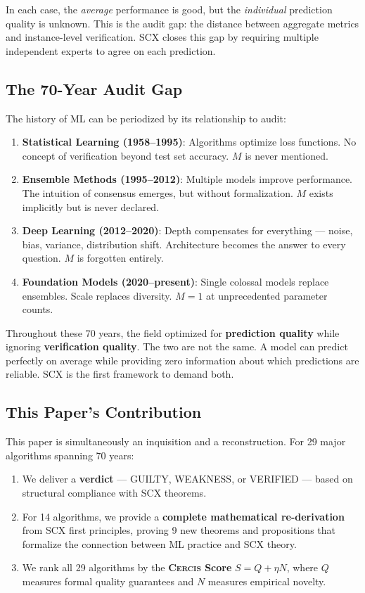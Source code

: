 \documentclass[12pt,a4paper]{article}
\theoremstyle{definition}
\newcommand{\Cercis}{\textsc{Cercis}}
\newcommand{\SCX}{\textsc{SCX}}
\begin{document}
In each case, the \textit{average} performance is good, but the \textit{individual} prediction quality is unknown. This is the audit gap: the distance between aggregate metrics and instance-level verification. \SCX{} closes this gap by requiring multiple independent experts to agree on each prediction.

\subsection{The 70-Year Audit Gap }

The history of ML can be periodized by its relationship to audit:

\begin{enumerate}[label=\textbf{Era \arabic*:}, nosep]
    \item \textbf{Statistical Learning (1958--1995)}: Algorithms optimize loss functions. No concept of verification beyond test set accuracy. $M$ is never mentioned.
    \item \textbf{Ensemble Methods (1995--2012)}: Multiple models improve performance. The intuition of consensus emerges, but without formalization. $M$ exists implicitly but is never declared.
    \item \textbf{Deep Learning (2012--2020)}: Depth compensates for everything — noise, bias, variance, distribution shift. Architecture becomes the answer to every question. $M$ is forgotten entirely.
    \item \textbf{Foundation Models (2020--present)}: Single colossal models replace ensembles. Scale replaces diversity. $M=1$ at unprecedented parameter counts.
\end{enumerate}

Throughout these 70 years, the field optimized for \textbf{prediction quality} while ignoring \textbf{verification quality}. The two are not the same. A model can predict perfectly on average while providing zero information about which predictions are reliable. \SCX{} is the first framework to demand both.

\subsection{This Paper's Contribution }

This paper is simultaneously an inquisition and a reconstruction. For 29 major algorithms spanning 70 years:

\begin{enumerate}[label=(\roman*)]
    \item We deliver a \textbf{verdict} — GUILTY, WEAKNESS, or VERIFIED — based on structural compliance with \SCX{} theorems.
    \item For 14 algorithms, we provide a \textbf{complete mathematical re-derivation} from \SCX{} first principles, proving 9 new theorems and propositions that formalize the connection between ML practice and \SCX{} theory.
    \item We rank all 29 algorithms by the \textbf{\Cercis{} Score} $S = Q + \eta N$, where $Q$ measures formal quality guarantees and $N$ measures empirical novelty.
\end{enumerate}
\end{document}
